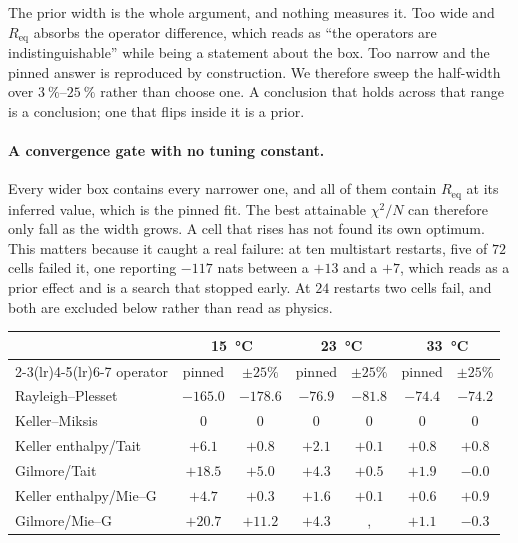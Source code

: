 \documentclass[10pt]{article}
\begin{document}
The prior width is the whole argument, and nothing measures it. Too wide and $R_{\mathrm{eq}}$ absorbs the operator difference, which reads as ``the
operators are indistinguishable'' while being a statement about the box. Too narrow and the
pinned answer is reproduced by construction. We therefore sweep the half-width over
$\SIrange{3}{25}{\percent}$ rather than choose one. A conclusion that holds across that range
is a conclusion; one that flips inside it is a prior.

\paragraph{A convergence gate with no tuning constant.} Every wider box contains every
narrower one, and all of them contain $R_{\mathrm{eq}}$ at its inferred value, which is the
pinned fit. The best attainable $\chi^2/N$ can therefore only fall as the width grows. A cell
that rises has not found its own optimum. This matters because it caught a real failure: at
ten multistart restarts, five of $72$ cells failed it, one reporting $-117$ nats between a
$+13$ and a $+7$, which reads as a prior effect and is a search that stopped early. At $24$
restarts two cells fail, and both are excluded below rather than read as physics.

\begin{center}
\begin{tabular}{lcccccc}
\toprule
& \multicolumn{2}{c}{\SI{15}{\celsius}} & \multicolumn{2}{c}{\SI{23}{\celsius}}
& \multicolumn{2}{c}{\SI{33}{\celsius}} \\
\cmidrule(lr){2-3}\cmidrule(lr){4-5}\cmidrule(lr){6-7}
operator & pinned & $\pm25\%$ & pinned & $\pm25\%$ & pinned & $\pm25\%$ \\
\midrule
Rayleigh--Plesset & $-165.0$ & $\mathbf{-178.6}$ & $-76.9$ & $\mathbf{-81.8}$ & $-74.4$ & $\mathbf{-74.2}$ \\
Keller--Miksis & $0$ & $0$ & $0$ & $0$ & $0$ & $0$ \\
Keller enthalpy/Tait & $+6.1$ & $+0.8$ & $+2.1$ & $+0.1$ & $+0.8$ & $+0.8$ \\
Gilmore/Tait & $+18.5$ & $\mathbf{+5.0}$ & $+4.3$ & $+0.5$ & $+1.9$ & $-0.0$ \\
Keller enthalpy/Mie--G & $+4.7$ & $+0.3$ & $+1.6$ & $+0.1$ & $+0.6$ & $+0.9$ \\
Gilmore/Mie--G & $+20.7$ & $\mathbf{+11.2}$ & $+4.3$ &, & $+1.1$ & $-0.3$ \\
\bottomrule
\end{tabular}
\end{center}
\end{document}
